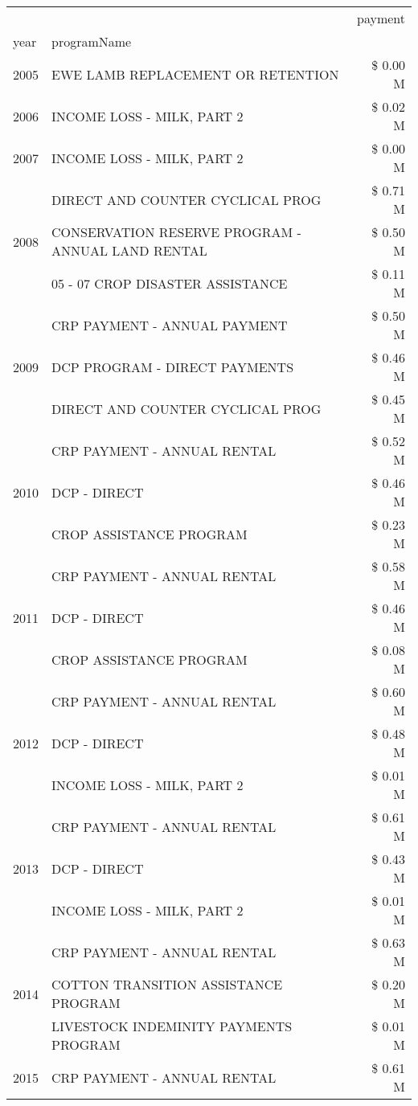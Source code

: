 \begin{tabular}{llr}
\toprule
 &  & payment \\
year & programName &  \\
\midrule
2005 & EWE LAMB REPLACEMENT OR RETENTION & \$ 0.00 M \\
\cline{1-3}
2006 & INCOME LOSS - MILK, PART 2 & \$ 0.02 M \\
\cline{1-3}
2007 & INCOME LOSS - MILK, PART 2 & \$ 0.00 M \\
\cline{1-3}
\multirow[t]{3}{*}{2008} & DIRECT AND COUNTER CYCLICAL PROG & \$ 0.71 M \\
 & CONSERVATION RESERVE PROGRAM - ANNUAL LAND RENTAL & \$ 0.50 M \\
 & 05 - 07 CROP DISASTER ASSISTANCE & \$ 0.11 M \\
\cline{1-3}
\multirow[t]{3}{*}{2009} & CRP PAYMENT - ANNUAL PAYMENT & \$ 0.50 M \\
 & DCP PROGRAM - DIRECT PAYMENTS & \$ 0.46 M \\
 & DIRECT AND COUNTER CYCLICAL PROG & \$ 0.45 M \\
\cline{1-3}
\multirow[t]{3}{*}{2010} & CRP PAYMENT - ANNUAL RENTAL & \$ 0.52 M \\
 & DCP - DIRECT & \$ 0.46 M \\
 & CROP ASSISTANCE PROGRAM & \$ 0.23 M \\
\cline{1-3}
\multirow[t]{3}{*}{2011} & CRP PAYMENT - ANNUAL RENTAL & \$ 0.58 M \\
 & DCP - DIRECT & \$ 0.46 M \\
 & CROP ASSISTANCE PROGRAM & \$ 0.08 M \\
\cline{1-3}
\multirow[t]{3}{*}{2012} & CRP PAYMENT - ANNUAL RENTAL & \$ 0.60 M \\
 & DCP - DIRECT & \$ 0.48 M \\
 & INCOME LOSS - MILK, PART 2 & \$ 0.01 M \\
\cline{1-3}
\multirow[t]{3}{*}{2013} & CRP PAYMENT - ANNUAL RENTAL & \$ 0.61 M \\
 & DCP - DIRECT & \$ 0.43 M \\
 & INCOME LOSS - MILK, PART 2 & \$ 0.01 M \\
\cline{1-3}
\multirow[t]{3}{*}{2014} & CRP PAYMENT - ANNUAL RENTAL & \$ 0.63 M \\
 & COTTON TRANSITION ASSISTANCE PROGRAM & \$ 0.20 M \\
 & LIVESTOCK INDEMINITY PAYMENTS PROGRAM & \$ 0.01 M \\
\cline{1-3}
\multirow[t]{3}{*}{2015} & CRP PAYMENT - ANNUAL RENTAL & \$ 0.61 M \\

\end{tabular}
